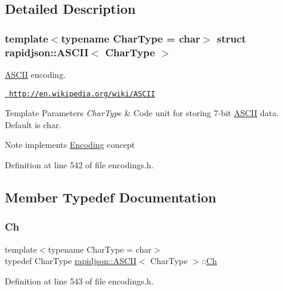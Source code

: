 \subsection{Detailed Description}
\subsubsection*{template$<$typename Char\+Type = char$>$\newline
struct rapidjson\+::\+A\+S\+C\+I\+I$<$ Char\+Type $>$}

\mbox{\hyperlink{structrapidjson_1_1_a_s_c_i_i}{A\+S\+C\+II}} encoding. 

\href{http://en.wikipedia.org/wiki/ASCII}{\texttt{ http\+://en.\+wikipedia.\+org/wiki/\+A\+S\+C\+II}} 
\begin{DoxyTemplParams}{Template Parameters}
{\em Char\+Type} & Code unit for storing 7-\/bit \mbox{\hyperlink{structrapidjson_1_1_a_s_c_i_i}{A\+S\+C\+II}} data. Default is char. \\
\hline
\end{DoxyTemplParams}
\begin{DoxyNote}{Note}
implements \mbox{\hyperlink{classrapidjson_1_1_encoding}{Encoding}} concept 
\end{DoxyNote}


Definition at line 542 of file encodings.\+h.



\subsection{Member Typedef Documentation}
\mbox{\label{structrapidjson_1_1_a_s_c_i_i_a2c1e49f42921027d58f1125a627cc5e5}} 
\subsubsection{\texorpdfstring{Ch}{Ch}}
{\footnotesize\ttfamily template$<$typename Char\+Type  = char$>$ \\
typedef Char\+Type \mbox{\hyperlink{structrapidjson_1_1_a_s_c_i_i}{rapidjson\+::\+A\+S\+C\+II}}$<$ Char\+Type $>$\+::\mbox{\hyperlink{structrapidjson_1_1_a_s_c_i_i_a2c1e49f42921027d58f1125a627cc5e5}{Ch}}}



Definition at line 543 of file encodings.\+h.



